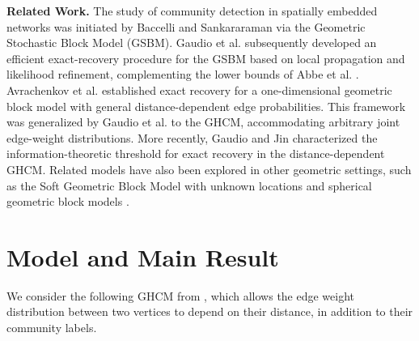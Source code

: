 \documentclass[11pt, a4paper]{amsart}
\newcommand{\1}{\mathbf{1}}
\theoremstyle{definition}
\theoremstyle{remark}
\theoremstyle{definition}
\begin{document}
\textbf{Related Work.} The study of community detection in spatially embedded networks was initiated by Baccelli and Sankararaman \cite{Sankararaman2018} via the Geometric Stochastic Block Model (GSBM). Gaudio et al. \cite{gaudio2025dec} subsequently developed an efficient exact-recovery procedure for the GSBM based on local propagation and likelihood refinement, complementing the lower bounds of Abbe et al. \cite{Abbe+2020}. Avrachenkov et al. \cite{avrachenkov2024communitydetectionblockmodels} established exact recovery for a one-dimensional geometric block model with general distance-dependent edge probabilities. This framework was generalized by Gaudio et al. \cite{gaudio2025incguan} to the GHCM, accommodating arbitrary joint edge-weight distributions. More recently, Gaudio and Jin \cite{gaudio2026jan} characterized the information-theoretic threshold for exact recovery in the distance-dependent GHCM. Related models have also been explored in other geometric settings, such as the Soft Geometric Block Model with unknown locations \cite{avrachenkov2021higher} and spherical geometric block models \cite{galhotra2018geometric,galhotra2023community}.



\section{Model and Main Result}
\label{sec:model}

We consider the following  GHCM from \cite{gaudio2026jan}, which allows the edge weight distribution between two vertices to depend on their distance, in addition to their community labels.
\end{document}
